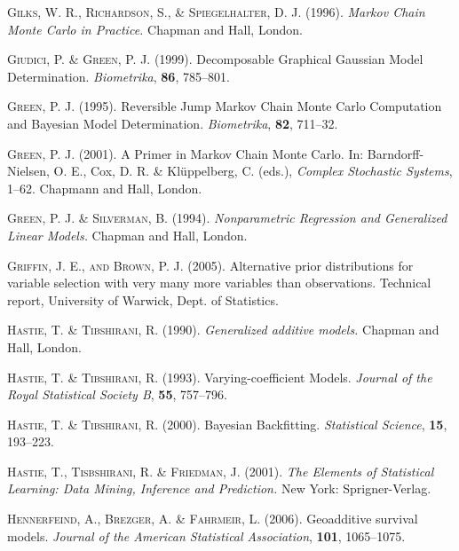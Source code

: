 \begin{thebibliography}{99}
 {\scshape Gilks, W. R., Richardson, S., \& Spiegelhalter, D. J.} (1996).
 {\it Markov Chain Monte Carlo in Practice.}
 Chapman and Hall, London.

 {\scshape Giudici, P. \& Green, P. J.} (1999).
 Decomposable Graphical Gaussian Model Determination.
 {\it Biometrika}, {\bf 86}, 785--801.

 {\scshape Green, P. J.} (1995).
 Reversible Jump Markov Chain Monte Carlo Computation and Bayesian Model Determination.
 {\it Biometrika}, {\bf  82}, 711--32.

 {\scshape Green, P. J.} (2001).
 A Primer in Markov Chain Monte Carlo.
 In: Barndorff-Nielsen, O. E., Cox, D. R. \& Kl\"{u}ppelberg, C. (eds.),
 {\it Complex Stochastic Systems}, 1--62.
 Chapmann and Hall, London.

 {\scshape Green, P. J. \& Silverman, B.} (1994).
 {\it Nonparametric Regression and Generalized Linear Models.}
 Chapman and Hall, London.
 
 {\scshape Griffin, J. E., and Brown, P. J.} (2005). Alternative prior distributions 
 for variable selection with very many more variables than observations. Technical 
 report, University of Warwick, Dept. of Statistics.
 
 {\scshape Hastie, T. \& Tibshirani, R.} (1990).
 {\it Generalized additive models.}
 Chapman and Hall, London.

 {\scshape Hastie, T. \& Tibshirani, R.} (1993).
 Varying-coefficient Models.
 {\it Journal of the Royal Statistical Society B}, {\bf 55}, 757--796.

 {\scshape Hastie, T. \& Tibshirani, R.} (2000).
 Bayesian Backfitting.
 {\it Statistical Science}, {\bf 15}, 193--223.

 {\scshape Hastie, T., Tisbshirani, R. \& Friedman, J.} (2001).
 {\it The Elements of Statistical Learning: Data Mining, Inference and Prediction.}
 New York: Sprigner-Verlag.

 {\scshape Hennerfeind, A., Brezger, A. \& Fahrmeir, L.} (2006).
 Geoadditive survival models.
 {\it Journal of the American Statistical Association}, {\bf 101}, 1065--1075.


\end{thebibliography}
